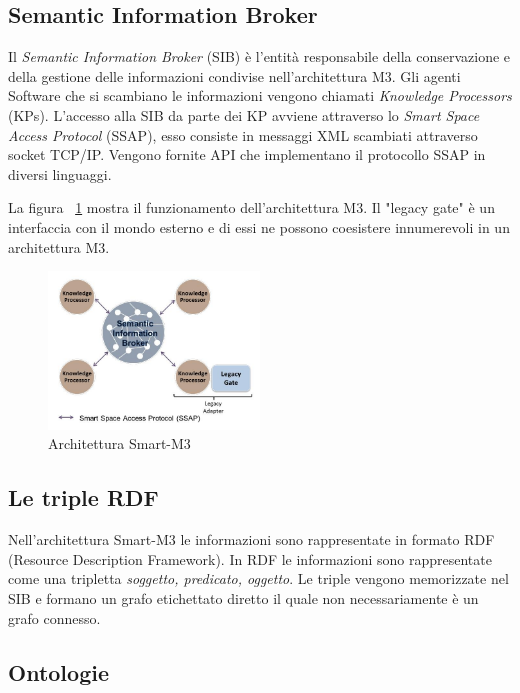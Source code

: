 \subsection{Semantic Information Broker}\label{subsec:sib}

Il \emph{Semantic Information Broker} (SIB) è l'entità responsabile della conservazione e della gestione delle informazioni condivise nell'architettura M3. Gli agenti Software che si scambiano le informazioni vengono chiamati \emph{Knowledge Processors} (KPs). L'accesso alla SIB da parte dei KP avviene attraverso lo \emph{Smart Space Access Protocol}  (SSAP), esso consiste in messaggi XML scambiati attraverso socket TCP/IP. Vengono fornite API che implementano il protocollo SSAP in diversi linguaggi.

La figura ~\ref{fig:smart-m3} mostra il funzionamento dell'architettura M3. Il "legacy gate" è un interfaccia con il mondo esterno e di essi ne possono coesistere innumerevoli in un architettura M3.

\begin{figure}[H]
	\centering
	\includegraphics[width=0.5\textwidth]{assets/smart-m3.jpg}
	\caption{Architettura Smart-M3}
	\label{fig:smart-m3}
\end{figure}

\subsection{Le triple RDF}

Nell'architettura Smart-M3 le informazioni sono rappresentate in formato RDF (Resource Description Framework). In RDF le informazioni sono rappresentate come una tripletta \emph{soggetto, predicato, oggetto}. Le triple vengono memorizzate nel SIB e formano un grafo etichettato diretto il quale non necessariamente è un grafo connesso.

\subsection{Ontologie}

